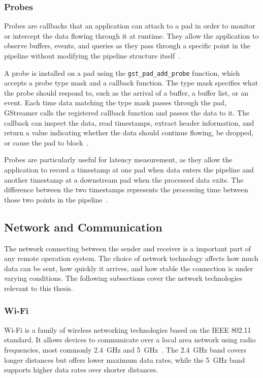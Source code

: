 \subsubsection{Probes}\label{subsec:probes}
Probes are callbacks that an application can attach to a pad in order to monitor or intercept the data flowing through it at runtime. They allow the application to observe buffers, events, and queries as they pass through a specific point in the pipeline without modifying the pipeline structure itself~\cite{gstreamer_probes}.
 
A probe is installed on a pad using the \texttt{gst\_pad\_add\_probe} function, which accepts a probe type mask and a callback function. The type mask specifies what the probe should respond to, such as the arrival of a buffer, a buffer list, or an event. Each time data matching the type mask passes through the pad, GStreamer calls the registered callback function and passes the data to it. The callback can inspect the data, read timestamps, extract header information, and return a value indicating whether the data should continue flowing, be dropped, or cause the pad to block~\cite{gstreamer_probes}.
 
Probes are particularly useful for latency measurement, as they allow the application to record a timestamp at one pad when data enters the pipeline and another timestamp at a downstream pad when the processed data exits. The difference between the two timestamps represents the processing time between those two points in the pipeline~\cite{gstreamer_pipeline_manip}.


\subsection{Network and Communication}\label{sec:network}
The network connecting between the sender and receiver is a important part of any remote operation system. The choice of network technology affects how much data can be sent, how quickly it arrives, and how stable the connection is under varying conditions. The following subsections cover the network technologies relevant to this thesis.
 
\subsubsection{Wi-Fi}\label{subsec:wifi}
Wi-Fi is a family of wireless networking technologies based on the IEEE 802.11 standard. It allows devices to communicate over a local area network using radio frequencies, most commonly 2.4~GHz and 5~GHz~\cite{ieee80211}. The 2.4~GHz band covers longer distances but offers lower maximum data rates, while the 5~GHz band supports higher data rates over shorter distances.
 
